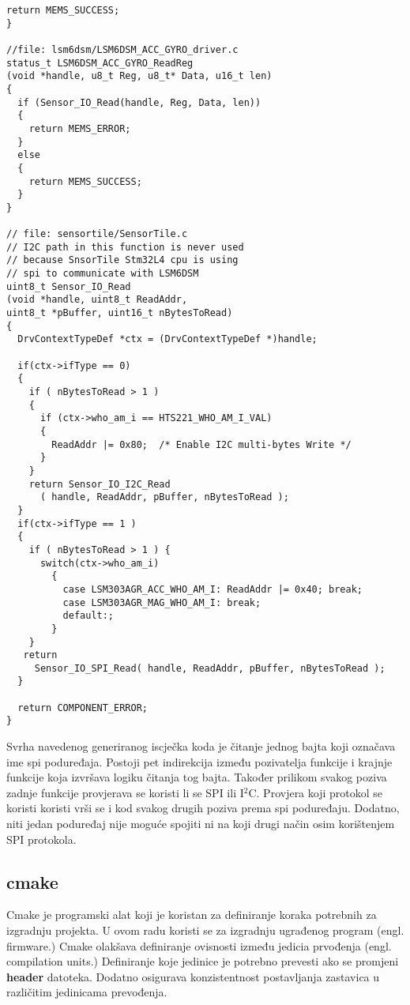 \documentclass[times, utf8, diplomski]{diplomski}
\begin{document}
\begin{lstlisting}[caption={Primjer geneririranog koda kojeg generira Stm32CUBE IDE}, label={badcode}, basicstyle={\ttfamily\footnotesize\tiny}]
  return MEMS_SUCCESS;
}

//file: lsm6dsm/LSM6DSM_ACC_GYRO_driver.c
status_t LSM6DSM_ACC_GYRO_ReadReg
(void *handle, u8_t Reg, u8_t* Data, u16_t len)
{
  if (Sensor_IO_Read(handle, Reg, Data, len))
  {
    return MEMS_ERROR;
  }
  else
  {
    return MEMS_SUCCESS;
  }
}

// file: sensortile/SensorTile.c
// I2C path in this function is never used
// because SnsorTile Stm32L4 cpu is using
// spi to communicate with LSM6DSM
uint8_t Sensor_IO_Read
(void *handle, uint8_t ReadAddr,
uint8_t *pBuffer, uint16_t nBytesToRead)
{
  DrvContextTypeDef *ctx = (DrvContextTypeDef *)handle;

  if(ctx->ifType == 0)
  {
    if ( nBytesToRead > 1 )
    {
      if (ctx->who_am_i == HTS221_WHO_AM_I_VAL)
      {
        ReadAddr |= 0x80;  /* Enable I2C multi-bytes Write */
      }
    }
    return Sensor_IO_I2C_Read
      ( handle, ReadAddr, pBuffer, nBytesToRead );
  }
  if(ctx->ifType == 1 )
  {
    if ( nBytesToRead > 1 ) {
      switch(ctx->who_am_i)
        {
          case LSM303AGR_ACC_WHO_AM_I: ReadAddr |= 0x40; break;
          case LSM303AGR_MAG_WHO_AM_I: break;
          default:;
        }
    }
   return
     Sensor_IO_SPI_Read( handle, ReadAddr, pBuffer, nBytesToRead );
  }

  return COMPONENT_ERROR;
}
\end{lstlisting}

Svrha navedenog generiranog iscječka koda je čitanje jednog bajta koji označava ime spi poduređaja. Postoji pet indirekcija između pozivatelja funkcije i krajnje funkcije koja izvršava logiku čitanja tog bajta. Također prilikom svakog poziva zadnje funkcije provjerava se koristi li se SPI ili I\(^2\)C. Provjera koji protokol se koristi koristi vrši se i kod svakog drugih poziva prema spi poduređaju. Dodatno, niti jedan poduređaj nije moguće spojiti ni na koji drugi način osim korištenjem SPI protokola.

\subsection{cmake}
Cmake je programski alat koji je koristan za definiranje koraka potrebnih za izgradnju projekta. U ovom radu koristi se za izgradnju ugrađenog program (engl. firmware.) Cmake olakšava definiranje ovisnosti između jedicia prvođenja (engl. compilation units.) Definiranje koje jedinice je potrebno prevesti ako se promjeni \textbf{header} datoteka. Dodatno osigurava konzistentnost postavljanja zastavica u različitim jedinicama prevođenja.
\end{document}
